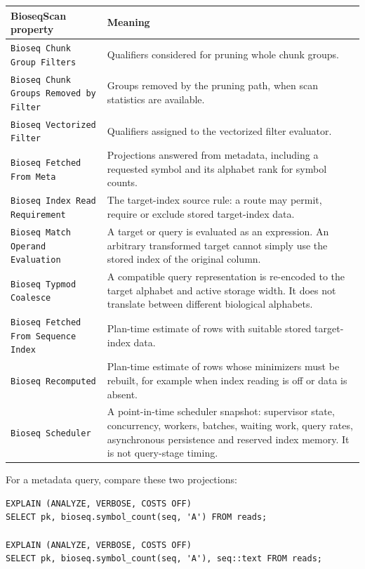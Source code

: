 \begingroup\small
\begin{longtable}{@{}p{.46\linewidth}p{.49\linewidth}@{}}
\toprule
\textbf{BioseqScan property} & \textbf{Meaning}\\
\midrule\endhead
\texttt{Bioseq Chunk Group Filters} & Qualifiers considered for pruning
whole chunk groups.\\
\texttt{Bioseq Chunk Groups Removed by Filter} & Groups removed by the
pruning path, when scan statistics are available.\\
\texttt{Bioseq Vectorized Filter} & Qualifiers assigned to the vectorized
filter evaluator.\\
\texttt{Bioseq Fetched From Meta} & Projections answered from metadata,
including a requested symbol and its alphabet rank for symbol counts.\\
\texttt{Bioseq Index Read Requirement} & The target-index source rule:
a route may permit, require or exclude stored target-index data.\\
\texttt{Bioseq Match Operand Evaluation} & A target or query is evaluated
as an expression. An arbitrary transformed target cannot simply use the
stored index of the original column.\\
\texttt{Bioseq Typmod Coalesce} & A compatible query representation is
re-encoded to the target alphabet and active storage width. It does not
translate between different biological alphabets.\\
\texttt{Bioseq Fetched From Sequence Index} & Plan-time estimate of rows
with suitable stored target-index data.\\
\texttt{Bioseq Recomputed} & Plan-time estimate of rows whose minimizers
must be rebuilt, for example when index reading is off or data is absent.\\
\texttt{Bioseq Scheduler} & A point-in-time scheduler snapshot: supervisor
state, concurrency, workers, batches, waiting work, query rates, asynchronous
persistence and reserved index memory. It is not query-stage timing.\\
\bottomrule
\end{longtable}
\endgroup

For a metadata query, compare these two projections:

\par\noindent\begin{minipage}{\linewidth}
\begin{lstlisting}[style=bioseq-appendix-sql]
EXPLAIN (ANALYZE, VERBOSE, COSTS OFF)
SELECT pk, bioseq.symbol_count(seq, 'A') FROM reads;

EXPLAIN (ANALYZE, VERBOSE, COSTS OFF)
SELECT pk, bioseq.symbol_count(seq, 'A'), seq::text FROM reads;
\end{lstlisting}
\end{minipage}

